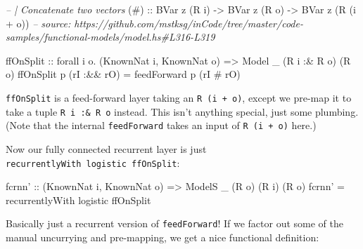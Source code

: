 \documentclass[]{article}
\newenvironment{Shaded}{}{}
\newcommand{\CommentTok}[1]{\textcolor[rgb]{0.38,0.63,0.69}{\textit{#1}}}
\newcommand{\DataTypeTok}[1]{\textcolor[rgb]{0.56,0.13,0.00}{#1}}
\newcommand{\FunctionTok}[1]{\textcolor[rgb]{0.02,0.16,0.49}{#1}}
\newcommand{\NormalTok}[1]{#1}
\newcommand{\OtherTok}[1]{\textcolor[rgb]{0.00,0.44,0.13}{#1}}
\begin{document}
\begin{Shaded}
\begin{Highlighting}[]
\CommentTok{-- | Concatenate two vectors}
\OtherTok{(#) ::} \DataTypeTok{BVar}\NormalTok{ z (}\DataTypeTok{R}\NormalTok{ i) }\OtherTok{->} \DataTypeTok{BVar}\NormalTok{ z (}\DataTypeTok{R}\NormalTok{ o) }\OtherTok{->} \DataTypeTok{BVar}\NormalTok{ z (}\DataTypeTok{R}\NormalTok{ (i }\FunctionTok{+}\NormalTok{ o))}
\CommentTok{-- source: https://github.com/mstksg/inCode/tree/master/code-samples/functional-models/model.hs#L316-L319}

\NormalTok{ffOnSplit}
\OtherTok{    ::}\NormalTok{ forall i o}\FunctionTok{.}\NormalTok{ (}\DataTypeTok{KnownNat}\NormalTok{ i, }\DataTypeTok{KnownNat}\NormalTok{ o)}
    \OtherTok{=>} \DataTypeTok{Model}\NormalTok{ _ (}\DataTypeTok{R}\NormalTok{ i }\FunctionTok{:&} \DataTypeTok{R}\NormalTok{ o) (}\DataTypeTok{R}\NormalTok{ o)}
\NormalTok{ffOnSplit p (rI }\FunctionTok{:&&}\NormalTok{ rO) }\FunctionTok{=}\NormalTok{ feedForward p (rI }\FunctionTok{#}\NormalTok{ rO)}
\end{Highlighting}
\end{Shaded}

\texttt{ffOnSplit} is a feed-forward layer taking an \texttt{R\ (i\ +\ o)},
except we pre-map it to take a tuple \texttt{R\ i\ :\&\ R\ o} instead. This
isn't anything special, just some plumbing. (Note that the internal
\texttt{feedForward} takes an input of \texttt{R\ (i\ +\ o)} here.)

Now our fully connected recurrent layer is just
\texttt{recurrentlyWith\ logistic\ ffOnSplit}:

\begin{Shaded}
\begin{Highlighting}[]
\NormalTok{fcrnn'}
\OtherTok{    ::}\NormalTok{ (}\DataTypeTok{KnownNat}\NormalTok{ i, }\DataTypeTok{KnownNat}\NormalTok{ o)}
    \OtherTok{=>} \DataTypeTok{ModelS}\NormalTok{ _ (}\DataTypeTok{R}\NormalTok{ o) (}\DataTypeTok{R}\NormalTok{ i) (}\DataTypeTok{R}\NormalTok{ o)}
\NormalTok{fcrnn' }\FunctionTok{=}\NormalTok{ recurrentlyWith logistic ffOnSplit}
\end{Highlighting}
\end{Shaded}

Basically just a recurrent version of \texttt{feedForward}! If we factor out
some of the manual uncurrying and pre-mapping, we get a nice functional
definition:
\end{document}

